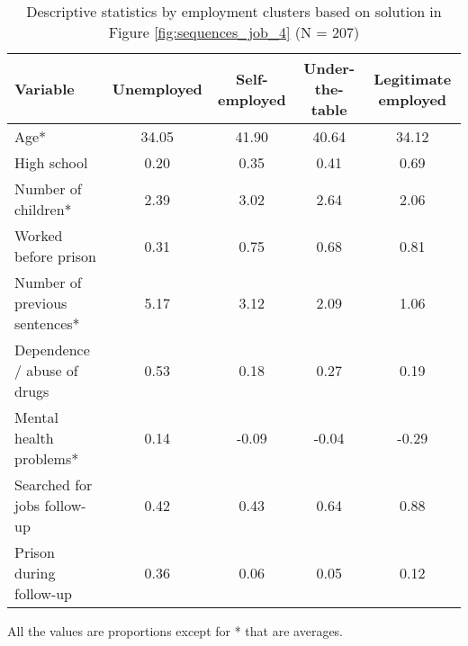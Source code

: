 \begin{table}[htp]
\footnotesize
\setlength{\tabcolsep}{10pt}
\renewcommand{\arraystretch}{1.3}
\begin{threeparttable}
\centering
\caption{Descriptive statistics by employment clusters \newline based on solution in Figure \ref{fig:sequences_job_4} (N = 207)} 
\label{tab:descriptives_job_4}
\begin{tabular}{lcccc}
  \hline
Variable & Unemployed & Self-employed & Under-the-table & Legitimate employed \\ 
  \hline
Age* & 34.05 & 41.90 & 40.64 & 34.12 \\ 
  High school & 0.20 & 0.35 & 0.41 & 0.69 \\ 
  Number of children* & 2.39 & 3.02 & 2.64 & 2.06 \\ 
  Worked before prison & 0.31 & 0.75 & 0.68 & 0.81 \\ 
  Number of previous sentences* & 5.17 & 3.12 & 2.09 & 1.06 \\ 
  Dependence / abuse of drugs & 0.53 & 0.18 & 0.27 & 0.19 \\ 
  Mental health problems* & 0.14 & -0.09 & -0.04 & -0.29 \\ 
  Searched for jobs follow-up & 0.42 & 0.43 & 0.64 & 0.88 \\ 
  Prison during follow-up & 0.36 & 0.06 & 0.05 & 0.12 \\ 
   \hline
\end{tabular}
\begin{tablenotes}
\scriptsize
\item All the values are proportions except for * that are averages.
\end{tablenotes}
\end{threeparttable}
\end{table}
